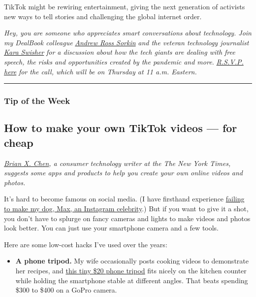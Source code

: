 TikTok might be rewiring entertainment, giving the next generation of
activists new ways to tell stories and challenging the global internet
order.

\emph{Hey, you are someone who appreciates smart conversations about
technology. Join my DealBook colleague}
\href{https://www.nytimes3xbfgragh.onion/by/andrew-ross-sorkin}{\emph{Andrew
Ross Sorkin}} \emph{and the veteran technology journalist}
\href{https://www.nytimes3xbfgragh.onion/column/kara-swisher}{\emph{Kara
Swisher}} \emph{for a discussion about how the tech giants are dealing
with free speech, the risks and opportunities created by the pandemic
and more.}
\href{https://timesevents.nytimes3xbfgragh.onion/dealbookdebrief0604}{\emph{R.S.V.P.
here}} \emph{for the call, which will be on Thursday at 11 a.m.
Eastern.}

\begin{center}\rule{0.5\linewidth}{\linethickness}\end{center}

\hypertarget{tip-of-the-week}{%
\subsubsection{Tip of the Week}\label{tip-of-the-week}}

\hypertarget{how-to-make-your-own-tiktok-videos--for-cheap}{%
\subsection{How to make your own TikTok videos --- for
cheap}\label{how-to-make-your-own-tiktok-videos--for-cheap}}

\href{https://www.nytimes3xbfgragh.onion/by/brian-x-chen}{\emph{Brian X.
Chen}}\emph{, a consumer technology writer at the The New York Times,
suggests some apps and products to help you create your own online
videos and photos.}

It's hard to become famous on social media. (I have firsthand experience
\href{https://www.nytimes3xbfgragh.onion/2018/12/05/technology/personaltech/instagram-influencers-dogs-food.html}{failing
to make my dog, Max, an Instagram celebrity}.) But if you want to give
it a shot, you don't have to splurge on fancy cameras and lights to make
videos and photos look better. You can just use your smartphone camera
and a few tools.

Here are some low-cost hacks I've used over the years:

\begin{itemize}
\tightlist
\item
  \textbf{A phone tripod.} My wife occasionally posts cooking videos to
  demonstrate her recipes, and
  \href{https://www.amazon.com/UBeesize-Portable-Adjustable-Universal-Compatible/dp/B06Y2VP3C7}{this
  tiny \$20 phone tripod} fits nicely on the kitchen counter while
  holding the smartphone stable at different angles. That beats spending
  \$300 to \$400 on a GoPro camera.
\end{itemize}

